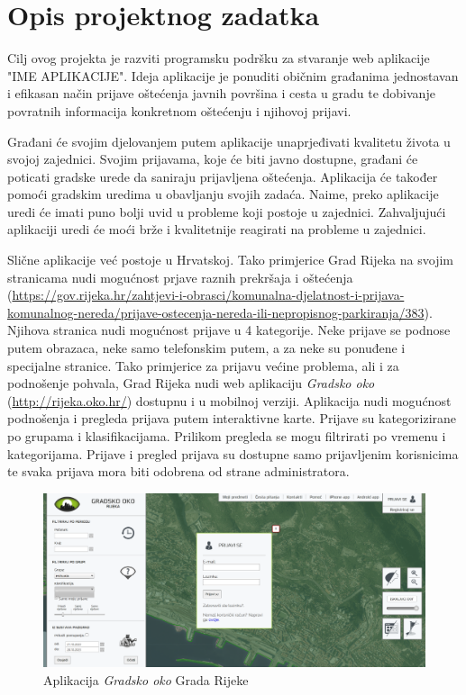 \chapter{Opis projektnog zadatka}
		
		Cilj ovog projekta je razviti programsku podršku za stvaranje web aplikacije "IME APLIKACIJE". Ideja aplikacije je ponuditi običnim građanima jednostavan i efikasan način prijave oštećenja javnih površina i cesta u gradu te dobivanje povratnih informacija konkretnom oštećenju i njihovoj prijavi. 
		
		Građani će svojim djelovanjem putem aplikacije unaprjeđivati kvalitetu života u svojoj zajednici. Svojim prijavama, koje će biti javno dostupne, građani će poticati gradske urede da saniraju prijavljena oštećenja. Aplikacija će također pomoći gradskim uredima u obavljanju svojih zadaća. Naime, preko aplikacije uredi će imati puno bolji uvid u probleme koji postoje u zajednici. Zahvaljujući aplikaciji uredi će moći brže i kvalitetnije reagirati na probleme u zajednici.
		
		Slične aplikacije već postoje u Hrvatskoj. Tako primjerice Grad Rijeka na svojim stranicama nudi mogućnost prjave raznih prekršaja i oštećenja (\url{https://gov.rijeka.hr/zahtjevi-i-obrasci/komunalna-djelatnost-i-prijava-komunalnog-nereda/prijave-ostecenja-nereda-ili-nepropisnog-parkiranja/383}). Njihova stranica nudi mogućnost prijave u 4 kategorije. Neke prijave se podnose putem obrazaca, neke samo telefonskim putem, a za neke su ponuđene i specijalne stranice. Tako primjerice za prijavu većine problema, ali i za podnošenje pohvala, Grad Rijeka nudi web aplikaciju \textit{Gradsko oko} (\url{http://rijeka.oko.hr/}) dostupnu i u mobilnoj verziji. Aplikacija nudi mogućnost podnošenja i pregleda prijava putem interaktivne karte. Prijave su kategorizirane po grupama i klasifikacijama. Prilikom pregleda se mogu filtrirati po vremenu i kategorijama. Prijave i pregled prijava su dostupne samo prijavljenim korisnicima te svaka prijava mora biti odobrena od strane administratora.
		
		\begin{figure}[H]
			\includegraphics[width=\textwidth]{slike/GradskoOko.PNG}
			\caption{Aplikacija \textit{Gradsko oko} Grada Rijeke}
			\label{fig:gradskooko} %
		\end{figure}
		
